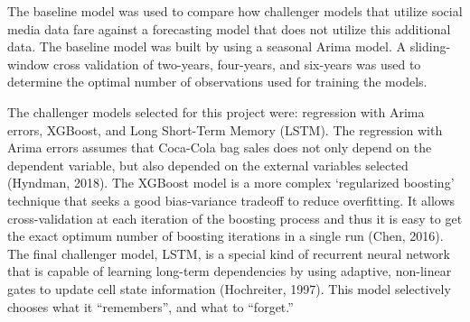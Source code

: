 \documentclass[12pt,oneside]{chicagocapstone}
\begin{document}
The baseline model was used to compare how challenger models that utilize social media data fare against a forecasting model that does not utilize this additional data. The baseline model was built by using a seasonal Arima model. A sliding-window cross validation of two-years, four-years, and six-years was used to determine the optimal number of observations used for training the models.

The challenger models selected for this project were: regression with Arima errors, XGBoost, and Long Short-Term Memory (LSTM). The regression with Arima errors assumes that Coca-Cola bag sales does not only depend on the dependent variable, but also depended on the external variables selected (Hyndman, 2018). The XGBoost model is a more complex `regularized boosting' technique that seeks a good bias-variance tradeoff to reduce overfitting. It allows cross-validation at each iteration of the boosting process and thus it is easy to get the exact optimum number of boosting iterations in a single run (Chen, 2016). The final challenger model, LSTM, is a special kind of recurrent neural network that is capable of learning long-term dependencies by using adaptive, non-linear gates to update cell state information (Hochreiter, 1997). This model selectively chooses what it ``remembers'', and what to ``forget.''
\end{document}
